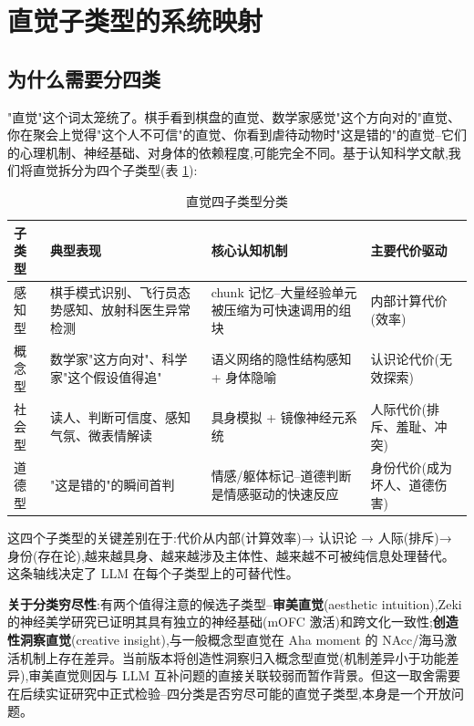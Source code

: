\documentclass[11pt,a4paper]{article}
\begin{document}
\section{直觉子类型的系统映射}

\subsection{为什么需要分四类}

"直觉"这个词太笼统了。棋手看到棋盘的直觉、数学家感觉"这个方向对的"直觉、你在聚会上觉得"这个人不可信"的直觉、你看到虐待动物时"这是错的"的直觉--它们的心理机制、神经基础、对身体的依赖程度,可能完全不同。基于认知科学文献,我们将直觉拆分为四个子类型(表 \ref{tab:subtypes}):

\begin{table}[htbp]
  \centering
  \caption{直觉四子类型分类}
  \label{tab:subtypes}
  \begin{tabular}{p{2.5cm}p{3.5cm}p{4cm}p{3.5cm}}
    \toprule
    \textbf{子类型} & \textbf{典型表现} & \textbf{核心认知机制} & \textbf{主要代价驱动} \\
    \midrule
    感知型 & 棋手模式识别、飞行员态势感知、放射科医生异常检测 & chunk 记忆--大量经验单元被压缩为可快速调用的组块 & 内部计算代价(效率) \\
    \hline
    概念型 & 数学家"这方向对"、科学家"这个假设值得追" & 语义网络的隐性结构感知 + 身体隐喻 & 认识论代价(无效探索) \\
    \hline
    社会型 & 读人、判断可信度、感知气氛、微表情解读 & 具身模拟 + 镜像神经元系统 & 人际代价(排斥、羞耻、冲突) \\
    \hline
    道德型 & "这是错的"的瞬间首判\cite{haidt2001emotional} & 情感/躯体标记--道德判断是情感驱动的快速反应 & 身份代价(成为坏人、道德伤害) \\
    \bottomrule
  \end{tabular}
\end{table}

这四个子类型的关键差别在于:代价从内部(计算效率)→ 认识论 → 人际(排斥)→ 身份(存在论),越来越具身、越来越涉及主体性、越来越不可被纯信息处理替代。这条轴线决定了 LLM 在每个子类型上的可替代性。

\textbf{关于分类穷尽性}:有两个值得注意的候选子类型--\textbf{审美直觉}(aesthetic intuition),Zeki 的神经美学研究已证明其具有独立的神经基础(mOFC 激活)和跨文化一致性;\textbf{创造性洞察直觉}(creative insight),与一般概念型直觉在 Aha moment 的 NAcc/海马激活机制上存在差异。当前版本将创造性洞察归入概念型直觉(机制差异小于功能差异),审美直觉则因与 LLM 互补问题的直接关联较弱而暂作背景。但这一取舍需要在后续实证研究中正式检验--四分类是否穷尽可能的直觉子类型,本身是一个开放问题。
\end{document}
